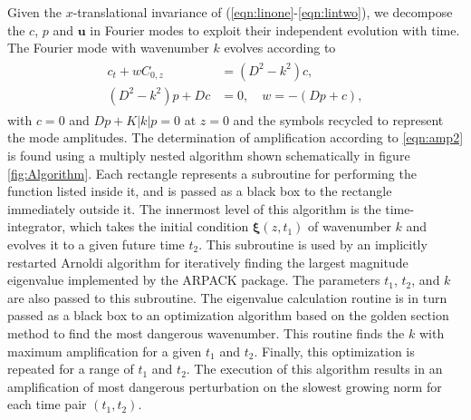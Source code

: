 \documentclass[letterpaper,10pt,prl,twocolumn,aps,reprint,superscriptaddress]{revtex4-1}
\newcommand{\bu}{\boldsymbol{u}}
\newcommand{\prt}{\boldsymbol{\xi}}
\begin{document}
Given the $x$-translational invariance of (\ref{eqn:linone}-\ref{eqn:lintwo}), we decompose the $c$, $p$ and $\bu$ in Fourier modes to exploit their independent evolution with time. 
The Fourier mode with wavenumber $k$ evolves according to
\begin{align}
\begin{split}
 c_t + w C_{0,z} &= (D^2-k^2) c,  \\
(D^2-k^2)p + Dc &= 0, \quad w = -(Dp + c),
\end{split}
\end{align}
with $c=0$ and $Dp + K|k| p =0$ at $z=0$ and the symbols recycled to represent the mode amplitudes. 
The determination of amplification according to \eqref{eqn:amp2} is found using a multiply nested algorithm shown schematically in figure \ref{fig:Algorithm}. 
Each rectangle represents a subroutine for performing the function listed inside it, and is passed as a black box to the rectangle immediately outside it.
The innermost level of this algorithm is the time-integrator, which takes the initial condition $\prt(z, t_1)$ of wavenumber $k$ and evolves it to a given future time $t_2$. 
This subroutine is used by an implicitly restarted Arnoldi algorithm for iteratively finding the largest magnitude eigenvalue implemented by the ARPACK package\cite{lehoucq1998arpack}. 
The parameters $t_1$, $t_2$, and $k$ are also passed to this subroutine. 
The eigenvalue calculation routine is in turn passed as a black box to an optimization algorithm based on the golden section method to find the most dangerous wavenumber. 
This routine finds the $k$ with maximum amplification for a given $t_1$ and $t_2$. 
Finally, this optimization is repeated for a range of $t_1$ and $t_2$. 
The execution of this algorithm results in an amplification of most dangerous perturbation on the slowest growing norm for each time pair $(t_1, t_2)$. 
\end{document}
